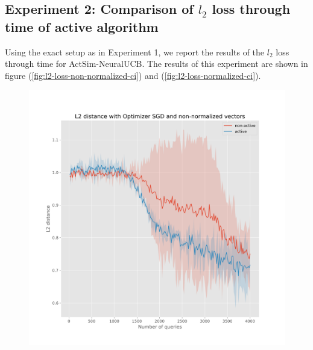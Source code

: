 \documentclass{article}
\begin{document}
\subsection{Experiment 2: Comparison of $l_2$ loss through time of active algorithm}
Using the exact setup as in Experiment 1, we report the results of the $l_2$ loss through time for ActSim-NeuralUCB.
The results of this experiment are shown in figure (\ref{fig:l2-loss-non-normalized-ci}) and (\ref{fig:l2-loss-normalized-ci}).
\begin{figure}[!h]
  \centering
  \begin{minipage}{.45\textwidth}
    \centering
    \includegraphics[width=\linewidth]{active-vs-base-moons-l2-loss-SGD-non-normalized-ci}
  \end{minipage}%
  \begin{minipage}{.45\textwidth}
    \centering

\end{minipage}
\end{figure}
\end{document}
